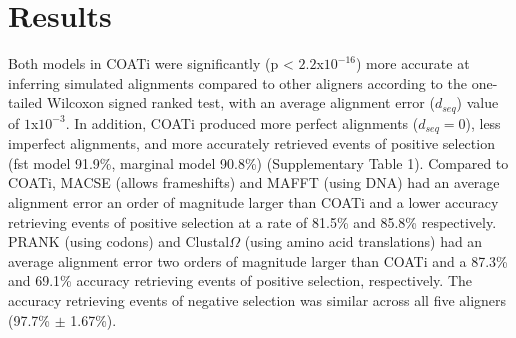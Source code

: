 \section{Results}



Both models in COATi were significantly (p < $2.2$x$10^{-16}$) more accurate at
inferring simulated alignments compared to other aligners according to the
one-tailed Wilcoxon signed ranked test, with an average alignment error
($d_{seq}$) value of $1$x$10^{-3}$.
In addition, COATi produced more perfect alignments ($d_{seq}=0$), less imperfect
alignments, and more accurately retrieved events of positive selection
(fst model 91.9\%, marginal model 90.8\%) (Supplementary Table 1).
Compared to COATi, MACSE (allows frameshifts) and MAFFT (using DNA) had an
average alignment error an order of magnitude larger than COATi and a lower
accuracy retrieving events of positive selection at a rate of 81.5\%
and 85.8\% respectively.
PRANK (using codons) and Clustal$\Omega$ (using amino acid translations) had
an average alignment error two orders of magnitude larger than COATi and a
87.3\% and 69.1\% accuracy retrieving events of positive selection, respectively.
The accuracy retrieving events of negative selection was similar across all five
aligners (97.7\% $\pm$ 1.67\%).


